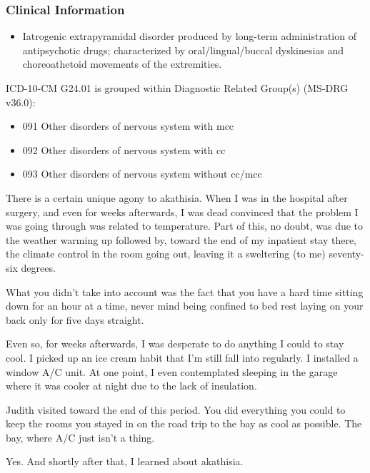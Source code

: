 \begin{paracol}{2}
\begin{leftcolumn}
\hypertarget{clinical-information-1}{%
\subsubsection{Clinical Information}\label{clinical-information-1}}

\begin{itemize}
\tightlist
\item
  Iatrogenic extrapyramidal disorder produced by long-term administration of antipsychotic drugs; characterized by oral/lingual/buccal dyskinesias and choreoathetoid movements of the extremities.
\end{itemize}

\noindent ICD-10-CM G24.01 is grouped within Diagnostic Related Group(s) (MS-DRG v36.0):

\begin{itemize}
\tightlist
\item
  091 Other disorders of nervous system with mcc
\item
  092 Other disorders of nervous system with cc
\item
  093 Other disorders of nervous system without cc/mcc
\end{itemize}
\newpage

\noindent There is a certain unique agony to akathisia. When I was in the hospital after surgery, and even for weeks afterwards, I was dead convinced that the problem I was going through was related to temperature. Part of this, no doubt, was due to the weather warming up followed by, toward the end of my inpatient stay there, the climate control in the room going out, leaving it a sweltering (to me) seventy-six degrees.

\begin{ally}
What you didn't take into account was the fact that you have a hard time sitting down for an hour at a time, never mind being confined to bed rest laying on your back only for five days straight.
\end{ally}
Even so, for weeks afterwards, I was desperate to do anything I could to stay cool. I picked up an ice cream habit that I'm still fall into regularly. I installed a window A/C unit. At one point, I even contemplated sleeping in the garage where it was cooler at night due to the lack of insulation.

\begin{ally}
Judith visited toward the end of this period. You did everything you could to keep the rooms you stayed in on the road trip to the bay as cool as possible. The bay, where A/C just isn't a thing.
\end{ally}
Yes. And shortly after that, I learned about akathisia.


\end{leftcolumn}
\end{paracol}
